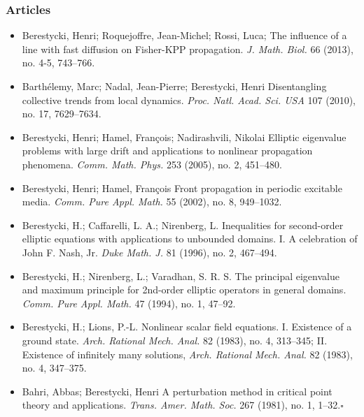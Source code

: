 \documentclass{article}
\begin{document}
\subsubsection{Articles}
\begin{itemize}
	\item Berestycki, Henri; Roquejoffre, Jean-Michel; Rossi, Luca; The influence of a line with fast diffusion on Fisher-KPP propagation. \textit{J. Math. Biol.} 66 (2013), no. 4-5, 743--766.
	\item Barthélemy, Marc; Nadal, Jean-Pierre; Berestycki, Henri Disentangling collective trends from local dynamics. \textit{Proc. Natl. Acad. Sci. USA} 107 (2010), no. 17, 7629--7634.
	\item Berestycki, Henri; Hamel, François; Nadirashvili, Nikolai Elliptic eigenvalue problems with large drift and applications to nonlinear propagation phenomena. \textit{Comm. Math. Phys.} 253 (2005), no. 2, 451--480.
	\item Berestycki, Henri; Hamel, François Front propagation in periodic excitable media. \textit{Comm. Pure Appl. Math.} 55 (2002), no. 8, 949--1032.
	\item Berestycki, H.; Caffarelli, L. A.; Nirenberg, L. Inequalities for second-order elliptic equations with applications to unbounded domains. I. A celebration of John F. Nash, Jr. \textit{Duke Math. J.} 81 (1996), no. 2, 467--494.
	\item Berestycki, H.; Nirenberg, L.; Varadhan, S. R. S. The principal eigenvalue and maximum principle for 2nd-order elliptic operators in general domains. \textit{Comm. Pure Appl. Math.} 47 (1994), no. 1, 47--92.
	\item Berestycki, H.; Lions, P.-L. Nonlinear scalar field equations. I. Existence of a ground state. \textit{Arch. Rational Mech. Anal.} 82 (1983), no. 4, 313--345; II. Existence of infinitely many solutions, \textit{Arch. Rational Mech. Anal.} 82 (1983), no. 4, 347--375.
	\item Bahri, Abbas; Berestycki, Henri A perturbation method in critical point theory and applications. \textit{Trans. Amer. Math. Soc.} 267 (1981), no. 1, 1--32.\hfill$\square$
\end{itemize}

\end{document}
